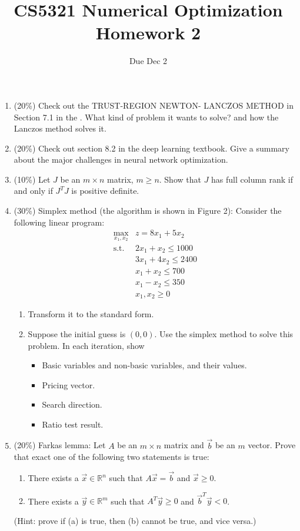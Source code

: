 \documentclass[a4paper,10pt]{article}
\title{CS5321 Numerical Optimization Homework 2}
\author{Due Dec 2}
\date{}
\begin{document}
\maketitle
\begin{enumerate}
 \item (20\%) Check out  the TRUST-REGION NEWTON- LANCZOS METHOD in Section 7.1 in the .  What kind of problem it wants to solve? and how the Lanczos method solves it. 

\item (20\%) Check out section 8.2 in the deep learning textbook.  Give a summary about the major challenges in neural network optimization.

\item (10\%)  Let $J$ be an $m\times n$ matrix, $m\ge n$.  Show that $J$ has full column rank if and only if $J^TJ$ is positive definite.
 


\item (30\%) Simplex method (the algorithm is shown in Figure 2): Consider the following linear program:
    $$\begin{array}{lll}
        \max_{x_1,x_2} & z=8x_1+5x_2 \\
        \mbox{s.t. } & 2x_1 + x_2 \le 1000  \\
         & 3x_1 + 4x_2 \le 2400   \\
         & x_1 + x_2 \le 700   \\
         & x_1 - x_2 \le 350   \\
         & x_1, x_2 \ge 0
      \end{array}$$
      \begin{enumerate}
    \item Transform it to the standard form. 
    \item Suppose the initial guess is $(0,0)$.  Use the simplex method to solve this problem. In each iteration, show
      \begin{itemize}
    \item Basic variables and non-basic variables, and their values.
    \item Pricing vector.
    \item Search direction.
    \item Ratio test result.
    \end{itemize}
    \end{enumerate}

\item (20\%) Farkas lemma: Let $A$ be an $m\times n$ matrix and $\vec{b}$ be an $m$ vector.
Prove that exact one of the following two statements is true:
\begin{enumerate}
\item There exists a $\vec{x}\in \mathbb{R}^n$ such that $A\vec{x} =\vec{b}$ and $\vec{x}\ge0$.
\item There exists a $\vec{y}\in\mathbb{R}^m$ such that $A^T\vec{y}\ge 0$ and $\vec{b}^T\vec{y}<0$.
\end{enumerate}
(Hint: prove if (a) is true, then (b) cannot be true, and vice versa.)

\end{enumerate}
\end{document}
